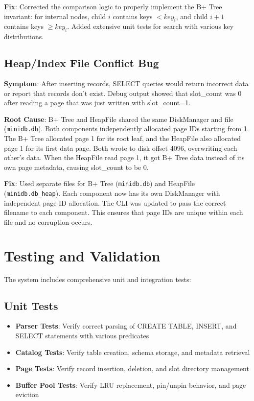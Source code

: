 \documentclass{article}
\begin{document}
\textbf{Fix}: Corrected the comparison logic to properly implement the B+ Tree invariant: for internal nodes, child $i$ contains keys $< key_i$, and child $i+1$ contains keys $\geq key_i$. Added extensive unit tests for search with various key distributions.

\subsection{Heap/Index File Conflict Bug}

\textbf{Symptom}: After inserting records, SELECT queries would return incorrect data or report that records don't exist. Debug output showed that slot\_count was 0 after reading a page that was just written with slot\_count=1.

\textbf{Root Cause}: B+ Tree and HeapFile shared the same DiskManager and file (\texttt{minidb.db}). Both components independently allocated page IDs starting from 1. The B+ Tree allocated page 1 for its root leaf, and the HeapFile also allocated page 1 for its first data page. Both wrote to disk offset 4096, overwriting each other's data. When the HeapFile read page 1, it got B+ Tree data instead of its own page metadata, causing slot\_count to be 0.

\textbf{Fix}: Used separate files for B+ Tree (\texttt{minidb.db}) and HeapFile (\texttt{minidb.db\_heap}). Each component now has its own DiskManager with independent page ID allocation. The CLI was updated to pass the correct filename to each component. This ensures that page IDs are unique within each file and no corruption occurs.

\section{Testing and Validation}

The system includes comprehensive unit and integration tests:

\subsection{Unit Tests}

\begin{itemize}
    \item \textbf{Parser Tests}: Verify correct parsing of CREATE TABLE, INSERT, and SELECT statements with various predicates
    \item \textbf{Catalog Tests}: Verify table creation, schema storage, and metadata retrieval
    \item \textbf{Page Tests}: Verify record insertion, deletion, and slot directory management
    \item \textbf{Buffer Pool Tests}: Verify LRU replacement, pin/unpin behavior, and page eviction
\end{itemize}
\end{document}
